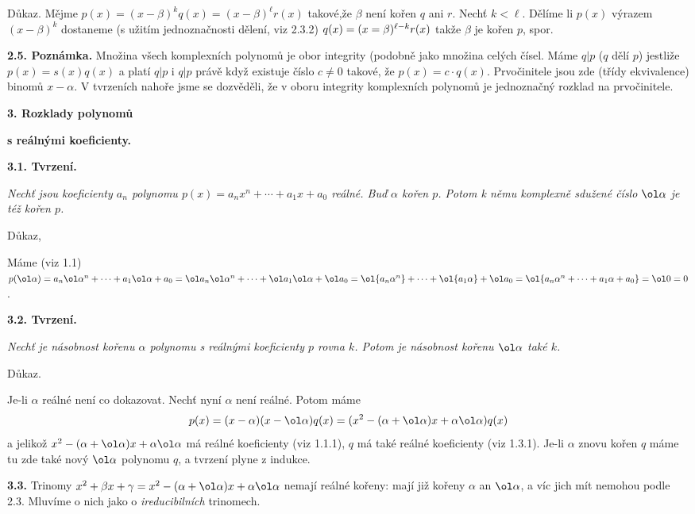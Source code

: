 \documentclass[12pt]{article}
\begin{document}
{{ Důkaz.} Mějme $p(x)=(x-\beta)^kq(x)=(x-\beta)^\ell r(x)$ takové,že $\beta$ není kořen  $q$ ani $r$.
 Nechť $k<\ell$. Dělíme li $p(x)$ výrazem \hbox{$(x-\beta)^k$} dostaneme (s užitím jednoznačnosti dělení, viz 2.3.2)  
 $q(x)=\hbox{$(x=\beta)^{\ell-k}r(x)$}$ takže $\beta$ je kořen $p$, spor.\sq
 
 \bigskip
 
 {\bf 2.5. Poznámka.} Množina všech komplexních polynomů je obor integrity (podobně jako množina celých čísel. Máme  $q|p$ ($q$ dělí $p$) jestliže $p(x)=s(x)q(x)$ a platí $q|p$ i $q|p$ právě když existuje číslo $c\neq 0$ takové, že $p(x)=c\cdot q(x)$. Prvočinitele jsou zde (třídy ekvivalence) binomů $x-\alpha$. V tvrzeních nahoře jsme se dozvěděli, že v oboru integrity komplexních polynomů je jednoznačný rozklad na prvočinitele.
 
 
 \vskip10mm
 
 {\large\bf 3. Rozklady polynomů  }
 
 
 \smallskip
 
  \hskip7mm{\large\bf s reálnými koeficienty.} 
 
 
 
 \bigskip
 
 {\bf 3.1. Tvrzení.} {\em Nechť jsou koeficienty $a_n$ polynomu 
 $p(x)= a_nx^n+\cdots+a_1x+a_0$ reálné. Buď $\alpha$ kořen $p$. Potom k němu komplexně sdužené číslo $\ol\alpha$
 je též kořen $p$.
 
 Důkaz,} Máme (viz 1.1) $p(\ol \alpha)= a_n\ol\alpha^n+\cdots+a_1\ol\alpha+a_0=
\ol a_n\ol\alpha^n+\cdots+\ol a_1\ol\alpha+\ol a_0=\ol{a_n\alpha^n}+\cdots+\ol{a_1\alpha}+\ol a_0=
\ol{a_n\alpha^n+\cdots+a_1\alpha+a_0}=\ol 0=0$.\sq

\bigskip

{\bf 3.2. Tvrzení.} {\em Nechť je násobnost kořenu $\alpha$ polynomu s reálnými koeficienty $p$ rovna $k$. Potom je násobnost kořenu $\ol\alpha$ také $k$.

Důkaz.} Je-li $\alpha$ reálné není co dokazovat. Nechť nyní $\alpha$ není reálné. Potom máme
$$
p(x)=(x-\alpha)(x-\ol\alpha)q(x)= (x^2- (\alpha+\ol\alpha)x+\alpha\ol\alpha)q(x)
$$
a jelikož $x^2-(\alpha+\ol\alpha)x+\alpha\ol\alpha$ má reálné koeficienty (viz  1.1.1), $q$ má také reálné koeficienty
(viz 1.3.1). Je-li $\alpha$ znovu kořen $q$ máme tu zde také nový $\ol\alpha$  polynomu $q$, a tvrzení plyne z indukce. \sq

\bigskip

{\bf 3.3.} Trinomy $x^2+\beta x+\gamma=x^2-(\alpha+\ol\alpha)x+\alpha\ol\alpha$ nemají reálné kořeny: mají již kořeny $\alpha$ an $\ol\alpha$, a víc jich mít nemohou podle 2.3. Mluvíme o nich jako o {\em ireducibilních} trinomech.

}
\end{document}
